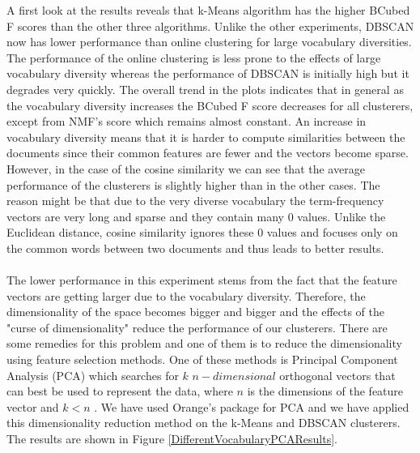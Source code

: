 A first look at the results reveals that k-Means algorithm has the higher BCubed F scores than the other three algorithms. Unlike the other experiments, DBSCAN now has lower performance than online clustering for large vocabulary diversities. The performance of the online clustering is less prone to the effects of large vocabulary diversity whereas the performance of DBSCAN is initially high but it degrades very quickly. The overall trend in the plots indicates that in general as the vocabulary diversity increases the BCubed F score decreases for all clusterers, except from NMF's score which remains almost constant. An increase in vocabulary diversity means that it is harder to compute similarities between the documents since their common features are fewer and the vectors become sparse. However, in the case of the cosine similarity we can see that the average performance of the clusterers is slightly higher than in the other cases. The reason might be that due to the very diverse vocabulary the term-frequency vectors are very long and sparse and they contain many 0 values. Unlike the Euclidean distance, cosine similarity ignores these 0 values and focuses only on the common words between two documents and thus leads to better results.\\\\
The lower performance in this experiment stems from the fact that the feature vectors are getting larger due to the vocabulary diversity. Therefore, the dimensionality of the space becomes bigger and bigger and the effects of the "curse of dimensionality" reduce the performance of our clusterers. There are some remedies for this problem and one of them is to reduce the dimensionality using feature selection methods. One of these methods is Principal Component Analysis (PCA) which searches for $k$ $n-dimensional$ orthogonal vectors that can best be used to represent the data, where $n$ is the dimensions of the feature vector and $k < n$ \citep{han2005}. We have used Orange's package for PCA and we have applied this dimensionality reduction method on the k-Means and DBSCAN clusterers. The results are shown in Figure \ref{DifferentVocabularyPCAResults}.\\\\ 
